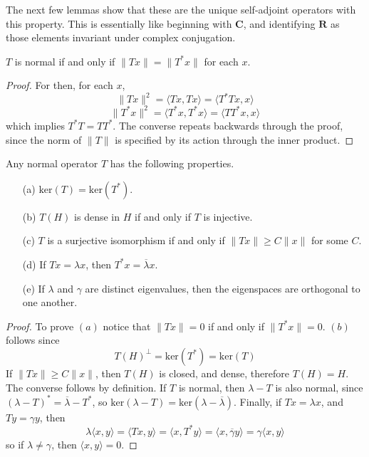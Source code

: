 The next few lemmas show that these are the unique self-adjoint operators with this property. This is essentially like beginning with $\mathbf{C}$, and identifying $\mathbf{R}$ as those elements invariant under complex conjugation.

\begin{theorem}
    $T$ is normal if and only if $\| Tx \| = \| T^* x \|$ for each $x$.
\end{theorem}
\begin{proof}
    For then, for each $x$,
    \[ \| Tx \|^2 = \langle Tx, Tx \rangle = \langle T^*Tx, x \rangle \]
    \[ \| T^*x \|^2 = \langle T^*x, T^*x \rangle = \langle TT^*x, x \rangle \]
    which implies $T^*T = TT^*$. The converse repeats backwards through the proof, since the norm of $\| T \|$ is specified by its action through the inner product.
\end{proof}

\begin{theorem}
    Any normal operator $T$ has the following properties.
    \begin{enumerate}
        \item[(a)] $\text{ker}(T) = \text{ker}(T^*)$.
        \item[(b)] $T(H)$ is dense in $H$ if and only if $T$ is injective.
        \item[(c)] $T$ is a surjective isomorphism if and only if $\| Tx \| \geq C \| x \|$ for some $C$.
        \item[(d)] If $Tx = \lambda x$, then $T^*x = \overline{\lambda} x$.
        \item[(e)] If $\lambda$ and $\gamma$ are distinct eigenvalues, then the eigenspaces are orthogonal to one another.
    \end{enumerate}
\end{theorem}
\begin{proof}
    To prove $(a)$ notice that $\| Tx \| = 0$ if and only if $\| T^*x \| = 0$. $(b)$ follows since
    \[ T(H)^\perp = \text{ker}(T^*) = \text{ker}(T) \]
    If $\| Tx \| \geq C \| x \|$, then $T(H)$ is closed, and dense, therefore $T(H) = H$. The converse follows by definition. If $T$ is normal, then $\lambda - T$ is also normal, since $(\lambda - T)^* = \overline{\lambda} - T^*$, so $\text{ker}(\lambda - T) = \text{ker}(\lambda - \overline{\lambda})$. Finally, if $Tx = \lambda x$, and $Ty = \gamma y$, then
    \[ \lambda \langle x, y \rangle = \langle Tx, y \rangle = \langle x, T^*y \rangle = \langle x, \overline{\gamma} y \rangle = \gamma \langle x, y \rangle \]
    so if $\lambda \neq \gamma$, then $\langle x,y \rangle = 0$.
\end{proof}

